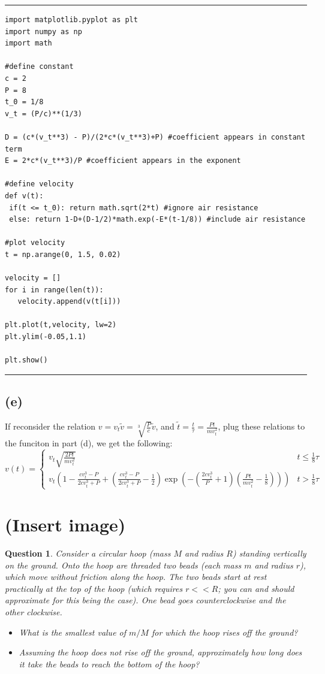\documentclass{article}
\newtheorem{question}{Question}
\begin{document}
\rule{15.24cm}{0.01mm}
\begin{verbatim}
import matplotlib.pyplot as plt
import numpy as np
import math

#define constant
c = 2
P = 8
t_0 = 1/8
v_t = (P/c)**(1/3)

D = (c*(v_t**3) - P)/(2*c*(v_t**3)+P) #coefficient appears in constant term
E = 2*c*(v_t**3)/P #coefficient appears in the exponent

#define velocity
def v(t):
 if(t <= t_0): return math.sqrt(2*t) #ignore air resistance
 else: return 1-D+(D-1/2)*math.exp(-E*(t-1/8)) #include air resistance

#plot velocity
t = np.arange(0, 1.5, 0.02)

velocity = []
for i in range(len(t)):
   velocity.append(v(t[i]))

plt.plot(t,velocity, lw=2)
plt.ylim(-0.05,1.1)

plt.show()
\end{verbatim}

\rule{15.24cm}{0.01mm}

\subsection*{(e)}
If reconsider the relation $v = v_t\tilde{v} = \sqrt[3]{\frac{P}{c}}\tilde{v}$, and $\tilde{t}=\frac{t}{\tau} = \frac{Pt}{mv_t^2}$, plug these relations to the funciton in part (d), we get the following:
$$v(t) = \begin{cases}
    v_t\sqrt{\frac{2Pt}{mv_t^2}} & t\leq \frac{1}{8}\tau\\
    v_t\left(1-\frac{cv_t^3-P}{2cv_t^3+P}+\left(\frac{cv_t^3-P}{2cv_t^3+P}-\frac{1}{2}\right)\exp\left(-\left(\frac{2cv_t^3}{P}+1\right)\left(\frac{Pt}{mv_t^2}-\frac{1}{8}\right)\right)\right) & t>\frac{1}{8}\tau
\end{cases}$$

\break



\section{(Insert image)}%
\begin{question}\label{q4}
    Consider a circular hoop (mass $M$ and radius $R$) standing vertically on the ground. Onto the hoop are threaded two beads (each mass $m$ and radius $r$), which move without friction along the hoop. The two beads start at rest practically at the top of the hoop (which requires $r<<R$; you can and should approximate for this being the case). One bead goes counterclockwise and the other clockwise.
    \begin{itemize}
        \item[(a)] What is the smallest value of $m/M$ for which the hoop rises off the ground?
        \item[(b)] Assuming the hoop does not rise off the ground, approximately how long does it take the beads to reach the bottom of the hoop? 
    \end{itemize}
\end{question}
\end{document}
